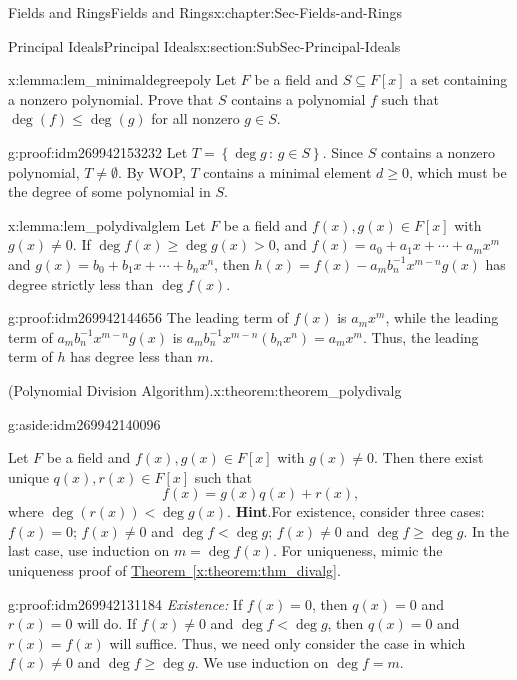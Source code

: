 \documentclass[oneside,10pt,]{book}
\numberwithin{equation}{section}
\renewcommand{\le}{\leqslant}
\renewcommand{\ge}{\geqslant}
\newcommand{\setof}[2]{{\left\{#1\,\colon\,#2\right\}}}
\newcommand{\lt}{<}
\begin{document}
\begin{chapterptx}{Fields and Rings}{}{Fields and Rings}{}{}{x:chapter:Sec-Fields-and-Rings}
\begin{sectionptx}{Principal Ideals}{}{Principal Ideals}{}{}{x:section:SubSec-Principal-Ideals}
\begin{lemma}{}{}{x:lemma:lem_minimaldegreepoly}%
Let \(F\) be a field and \(S\subseteq F[x]\) a set containing a nonzero polynomial. Prove that \(S\) contains a polynomial \(f\) such that \(\deg(f) \le \deg(g)\) for all nonzero \(g\in S\).%
\end{lemma}
\begin{proofptx}{}{g:proof:idm269942153232}
Let \(T = \setof{\deg g}{g\in S}\). Since \(S\) contains a nonzero polynomial, \(T\ne \emptyset\). By WOP, \(T\) contains a minimal element \(d \ge 0\), which must be the degree of some polynomial in \(S\).%
\end{proofptx}
\begin{lemma}{}{}{x:lemma:lem_polydivalglem}%
Let \(F\) be a field and \(f(x),g(x)\in F[x]\) with \(g(x)\ne 0\). If \(\deg f(x) \ge \deg g(x) > 0\), and \(f(x) = a_0 + a_1 x + \cdots + a_m x^m\) and \(g(x) = b_0 + b_1 x + \cdots + b_n x^n\), then \(h(x) = f(x) - a_m b_n^{-1} x^{m-n} g(x)\) has degree strictly less than \(\deg f(x)\).%
\end{lemma}
\begin{proofptx}{}{g:proof:idm269942144656}
The leading term of \(f(x)\) is \(a_m x^m\), while the leading term of \(a_m b_n^{-1} x^{m-n} g(x)\) is \(a_m b_n^{-1} x^{m-n} (b_n x^n) = a_m x^m\). Thus, the leading term of \(h\) has degree less than \(m\).%
\end{proofptx}
\begin{theorem}{(Polynomial Division Algorithm).}{}{x:theorem:theorem_polydivalg}%
\begin{aside}{}{g:aside:idm269942140096}%
\end{aside}
Let \(F\) be a field and \(f(x),g(x)\in F[x]\) with \(g(x)\ne 0\). Then there exist unique \(q(x),
r(x) \in F[x]\) such that%
\begin{equation*}
f(x) = g(x) q(x) + r(x)\text{,}
\end{equation*}
where \(\deg(r(x)) \lt  \deg g(x)\).%
\textbf{Hint}.\quad{}For existence, consider three cases: \(f(x) = 0\); \(f(x) \ne 0\) and \(\deg f \lt \deg g\); \(f(x) \ne 0\) and \(\deg f \ge \deg g\). In the last case, use induction on \(m = \deg f(x)\). For uniqueness, mimic the uniqueness proof of \hyperref[x:theorem:thm_divalg]{Theorem~\ref{x:theorem:thm_divalg}}.%
\end{theorem}
\begin{proofptx}{}{g:proof:idm269942131184}
\emph{Existence:} If \(f(x) = 0\), then \(q(x) = 0\) and \(r(x) = 0\) will do. If \(f(x)\ne 0\) and \(\deg f \lt \deg g\), then \(q(x) = 0\) and \(r(x) = f(x)\) will suffice. Thus, we need only consider the case in which \(f(x) \ne 0\) and \(\deg f \ge \deg g\). We use induction on \(\deg f = m\).%

\end{proofptx}
\end{sectionptx}
\end{chapterptx}
\end{document}
